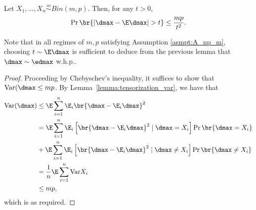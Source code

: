 \begin{lemma}\label{lemma:d_max_concentration}
    Let $X_1, \ldots, X_n  \overset{\underset{\mathrm{iid}}{}}{\sim} Bin(m,p)$. Then, for any $t > 0$, 
    \begin{align*}
        \Pr\br{\left |\dmax-\E \dmax\right|> t}\leq \frac{mp}{t^2}.
    \end{align*}
\end{lemma}
\begin{remark}
    Note that in all regimes of $m, p$ satisfying Assumption \ref{asmpt:A_np_m}, choosing $t \sim {\E \dmax}$ is sufficient to deduce from the previous lemma that $\dmax\sim \edmax$ w.h.p..
\end{remark}
\begin{proof}
    Proceeding by Chebyschev's inequality, it suffices to show that $\text{Var}(\dmax\leq mp$. By Lemma~\ref{lemma:tensorization_var}, we have that 
    \begin{align*}
        \text{Var}(\dmax) & \leq \E \sum_{i = 1}^n \E_i\br{ \dmax - \E_i \dmax}^2\\
        & = \E \sum_{i = 1}^n \E_i\left[\br{ \dmax - \E_i \dmax}^2\mid \dmax = X_i \right]\Pr \br{\dmax = X_i} \\
        & +  \E \sum_{i = 1}^n \E_i\left[\br{ \dmax - \E_i \dmax}^2\mid \dmax \neq X_i \right]\Pr \br{\dmax \neq X_i} \\
        & = \frac1n\E \sum_{i = 1}^n \text{Var}X_i \\
        & \leq mp,
    \end{align*}
which is as required.
\end{proof}

